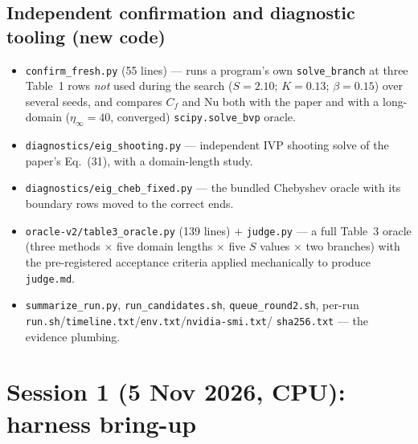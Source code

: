 \documentclass[11pt,a4paper]{article}
\newcommand{\code}[1]{\texttt{\small #1}}
\begin{document}
\subsection{Independent confirmation and diagnostic tooling (new code)}
\begin{itemize}[leftmargin=1.4em,itemsep=1pt]
  \item \code{confirm\_fresh.py} (55 lines) --- runs a program's own \code{solve\_branch}
        at three Table~1 rows \emph{not} used during the search
        ($S{=}2.10$; $K{=}0.13$; $\beta{=}0.15$) over several seeds, and compares $C_f$ and
        $\mathrm{Nu}$ both with the paper and with a long-domain
        ($\eta_\infty{=}40$, converged) \code{scipy.solve\_bvp} oracle.
  \item \code{diagnostics/eig\_shooting.py} --- independent IVP shooting solve of the
        paper's Eq.~(31), with a domain-length study.
  \item \code{diagnostics/eig\_cheb\_fixed.py} --- the bundled Chebyshev oracle with its
        boundary rows moved to the correct ends.
  \item \code{oracle-v2/table3\_oracle.py} (139 lines) $+$ \code{judge.py} --- a
        full Table~3 oracle (three methods $\times$ five domain lengths $\times$ five $S$
        values $\times$ two branches) with the pre-registered acceptance criteria applied
        mechanically to produce \code{judge.md}.
  \item \code{summarize\_run.py}, \code{run\_candidates.sh}, \code{queue\_round2.sh},
        per-run \code{run.sh}/\code{timeline.txt}/\code{env.txt}/\code{nvidia-smi.txt}/
        \code{sha256.txt} --- the evidence plumbing.
\end{itemize}

\section{Session 1 (5 Nov 2026, CPU): harness bring-up}
\end{document}
